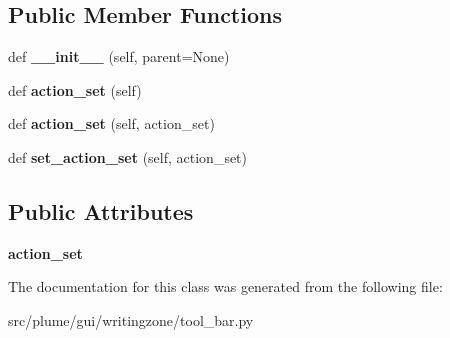 \subsection*{Public Member Functions}
\begin{DoxyCompactItemize}
\item 
def {\bfseries \+\_\+\+\_\+init\+\_\+\+\_\+} (self, parent=None)\hypertarget{classplume-creator_1_1src_1_1plume_1_1gui_1_1writingzone_1_1tool__bar_1_1_tool_bar_aed5c2d6853e561fadf17673d56677d02}{}\label{classplume-creator_1_1src_1_1plume_1_1gui_1_1writingzone_1_1tool__bar_1_1_tool_bar_aed5c2d6853e561fadf17673d56677d02}

\item 
def {\bfseries action\+\_\+set} (self)\hypertarget{classplume-creator_1_1src_1_1plume_1_1gui_1_1writingzone_1_1tool__bar_1_1_tool_bar_a494b81ccfc1ae2c99dbf42782f2636e7}{}\label{classplume-creator_1_1src_1_1plume_1_1gui_1_1writingzone_1_1tool__bar_1_1_tool_bar_a494b81ccfc1ae2c99dbf42782f2636e7}

\item 
def {\bfseries action\+\_\+set} (self, action\+\_\+set)\hypertarget{classplume-creator_1_1src_1_1plume_1_1gui_1_1writingzone_1_1tool__bar_1_1_tool_bar_a75e7b88d07206b474ddb64cac29e4a52}{}\label{classplume-creator_1_1src_1_1plume_1_1gui_1_1writingzone_1_1tool__bar_1_1_tool_bar_a75e7b88d07206b474ddb64cac29e4a52}

\item 
def {\bfseries set\+\_\+action\+\_\+set} (self, action\+\_\+set)\hypertarget{classplume-creator_1_1src_1_1plume_1_1gui_1_1writingzone_1_1tool__bar_1_1_tool_bar_aa01b78d598076287494ed92130fbcaf0}{}\label{classplume-creator_1_1src_1_1plume_1_1gui_1_1writingzone_1_1tool__bar_1_1_tool_bar_aa01b78d598076287494ed92130fbcaf0}

\end{DoxyCompactItemize}
\subsection*{Public Attributes}
\begin{DoxyCompactItemize}
\item 
{\bfseries action\+\_\+set}\hypertarget{classplume-creator_1_1src_1_1plume_1_1gui_1_1writingzone_1_1tool__bar_1_1_tool_bar_a45a7f5c3e0be19f9119a3c822571c3c9}{}\label{classplume-creator_1_1src_1_1plume_1_1gui_1_1writingzone_1_1tool__bar_1_1_tool_bar_a45a7f5c3e0be19f9119a3c822571c3c9}

\end{DoxyCompactItemize}


The documentation for this class was generated from the following file\+:\begin{DoxyCompactItemize}
\item 
src/plume/gui/writingzone/tool\+\_\+bar.\+py\end{DoxyCompactItemize}

